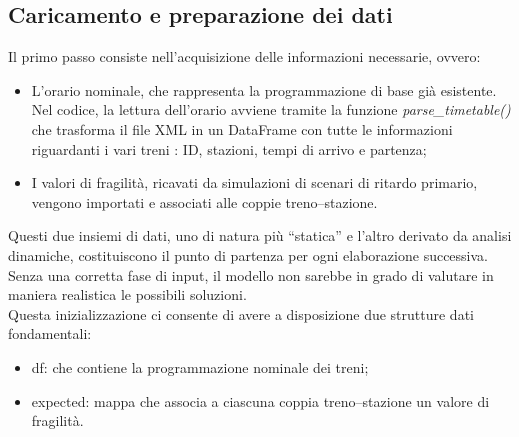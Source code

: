 \documentclass[a4paper,12pt]{report}
\begin{document}
\subsection{Caricamento e preparazione dei dati}

Il primo passo consiste nell’acquisizione delle informazioni necessarie, ovvero:

\begin{itemize}
    \item L’orario nominale, che rappresenta la programmazione di base già esistente. \\ Nel codice, la lettura dell’orario avviene tramite la funzione \textit{parse\_timetable()} che trasforma il file XML in un DataFrame con tutte le informazioni riguardanti i vari treni : ID, stazioni, tempi di arrivo e partenza; 
    
    \item I valori di fragilità, ricavati da simulazioni di scenari di ritardo primario, vengono importati e associati alle coppie treno–stazione.
\end{itemize}
Questi due insiemi di dati, uno di natura più “statica” e l’altro derivato da analisi dinamiche, costituiscono il punto di partenza per ogni elaborazione successiva. Senza una corretta fase di input, il modello non sarebbe in grado di valutare in maniera realistica le possibili soluzioni. \\ Questa inizializzazione ci consente di avere a disposizione due strutture dati fondamentali:
\begin{itemize}
    \item df: che contiene la programmazione nominale dei treni;
    
    \item expected: mappa che associa a ciascuna coppia treno–stazione un valore di fragilità.
    
\end{itemize}
\end{document}
